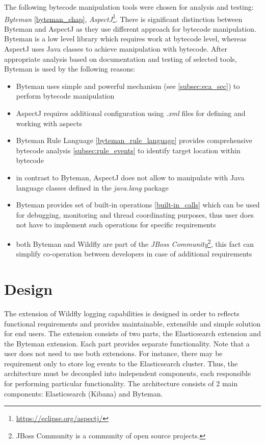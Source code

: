 \documentclass[12pt,oneside]{fithesis2}
\begin{document}
The following bytecode manipulation tools were chosen for analysis and testing: \textit{Byteman} \ref{byteman_chap},  \textit{AspectJ}\footnote{\url{https://eclipse.org/aspectj/}}. There is significant distinction between Byteman and AspectJ as they use different approach for bytecode manipulation. Byteman is a low level library which requires work at bytecode level, whereas AspectJ uses Java classes to achieve manipulation with bytecode. After appropriate analysis based on documentation and testing of selected tools, Byteman is used by the following reasons:

\begin{itemize}
	\item Byteman uses simple and powerful mechanism (see \ref{subsec:eca_sec}) to perform bytecode manipulation 
	\item AspectJ requires additional configuration using \textit{.xml} files for defining and working with aspects \cite[Configuration]{aspectj_doc}
	\item Byteman Rule Language \ref{byteman_rule_language} provides comprehensive bytecode analysis \ref{subsec:rule_events} to identify target location within bytecode
	\item in contrast to Byteman, AspectJ does not allow to manipulate with Java language classes defined in the \textit{java.lang} package \cite[Special cases]{aspectj_doc}
	\item Byteman provides set of built-in operations \ref{built-in_calls} which can be used for debugging, monitoring and thread coordinating purposes, thus user does not have to implement such operations for specific requirements
	\item both Byteman and Wildfly are part of the \textit{JBoss Community}\footnote{JBoss Community is a community of open source projects.}, this fact can simplify co-operation between developers in case of additional requirements
\end{itemize}

\section{Design}
The extension of Wildfly logging capabilities is designed in order to reflects functional requirements and provides maintainable, extensible and simple solution for end users. The extension consists of two parts, the Elasticsearch extension and the Byteman extension. Each part provides separate functionality. Note that a user does not need to use both extensions. For instance, there may be requirement only to store log events to the Elasticsearch cluster. Thus, the architecture must be decoupled into independent components, each responsible for performing particular functionality. The architecture consists of 2 main components: Elasticsearch (Kibana) and Byteman.
\end{document}
